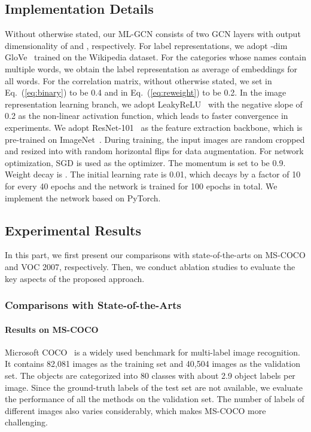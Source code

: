 \documentclass[10pt,twocolumn,letterpaper]{article}
\begin{document}
\subsection{Implementation Details}

Without otherwise stated, our ML-GCN consists of two GCN layers with output dimensionality of  and , respectively.
For label representations, we adopt -dim GloVe~\cite{glove} trained on the Wikipedia dataset. For the categories whose names contain multiple words, we obtain the label representation as average of embeddings for all words. For the correlation matrix, without otherwise stated, we set  in Eq.~(\ref{eq:binary}) to be 0.4 and  in Eq.~(\ref{eq:reweight}) to be 0.2. In the image representation learning branch, we adopt LeakyReLU~\cite{leakyrelu} with the negative slope of 0.2 as the non-linear activation function, which leads to faster convergence in experiments. We adopt ResNet-101~\cite{resnet} as the feature extraction backbone, which is
pre-trained on {ImageNet}~\cite{imagenet}.
During training, the input images are random cropped and resized into  with random horizontal flips for data augmentation. For network optimization, SGD is used as the optimizer. The momentum is set to be 0.9. Weight decay is . The initial learning rate is 0.01, which decays by a factor of 10 for every 40 epochs and the network is trained for 100 epochs in total. We implement the network based on PyTorch.



\subsection{Experimental Results}

In this part, we first present our comparisons with state-of-the-arts on MS-COCO and VOC 2007, respectively. Then, we conduct ablation studies to evaluate the key aspects of the proposed approach.

\subsubsection{Comparisons with State-of-the-Arts}

\paragraph{Results on MS-COCO}

Microsoft COCO~\cite{coco} is a widely used benchmark for multi-label image recognition. It contains 82,081 images as the training set and 40,504 images as the validation set. The objects are categorized into 80 classes with about 2.9 object labels per image. Since the ground-truth labels of the test set are not available, we evaluate the performance of all the methods on the validation set. The number of labels of different images also varies considerably, which makes MS-COCO more challenging.  
\end{document}
